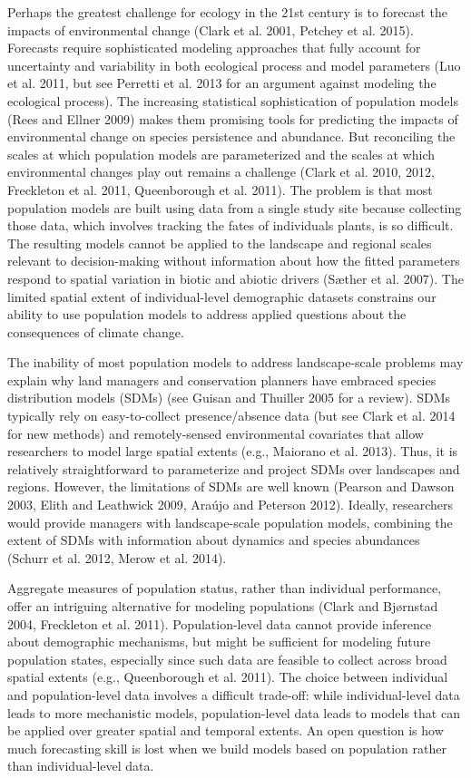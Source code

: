 \documentclass[12pt,]{article}
\begin{document}
Perhaps the greatest challenge for ecology in the 21st century is to
forecast the impacts of environmental change (Clark et al. 2001, Petchey
et al. 2015). Forecasts require sophisticated modeling approaches that
fully account for uncertainty and variability in both ecological process
and model parameters (Luo et al. 2011, but see Perretti et al. 2013 for
an argument against modeling the ecological process). The increasing
statistical sophistication of population models (Rees and Ellner 2009)
makes them promising tools for predicting the impacts of environmental
change on species persistence and abundance. But reconciling the scales
at which population models are parameterized and the scales at which
environmental changes play out remains a challenge (Clark et al. 2010,
2012, Freckleton et al. 2011, Queenborough et al. 2011). The problem is
that most population models are built using data from a single study
site because collecting those data, which involves tracking the fates of
individuals plants, is so difficult. The resulting models cannot be
applied to the landscape and regional scales relevant to decision-making
without information about how the fitted parameters respond to spatial
variation in biotic and abiotic drivers (Sæther et al. 2007). The
limited spatial extent of individual-level demographic datasets
constrains our ability to use population models to address applied
questions about the consequences of climate change.

The inability of most population models to address landscape-scale
problems may explain why land managers and conservation planners have
embraced species distribution models (SDMs) (see Guisan and Thuiller
2005 for a review). SDMs typically rely on easy-to-collect
presence/absence data (but see Clark et al. 2014 for new methods) and
remotely-sensed environmental covariates that allow researchers to model
large spatial extents (e.g., Maiorano et al. 2013). Thus, it is
relatively straightforward to parameterize and project SDMs over
landscapes and regions. However, the limitations of SDMs are well known
(Pearson and Dawson 2003, Elith and Leathwick 2009, Araújo and Peterson
2012). Ideally, researchers would provide managers with landscape-scale
population models, combining the extent of SDMs with information about
dynamics and species abundances (Schurr et al. 2012, Merow et al. 2014).

Aggregate measures of population status, rather than individual
performance, offer an intriguing alternative for modeling populations
(Clark and Bjørnstad 2004, Freckleton et al. 2011). Population-level
data cannot provide inference about demographic mechanisms, but might be
sufficient for modeling future population states, especially since such
data are feasible to collect across broad spatial extents (e.g.,
Queenborough et al. 2011). The choice between individual and
population-level data involves a difficult trade-off: while
individual-level data leads to more mechanistic models, population-level
data leads to models that can be applied over greater spatial and
temporal extents. An open question is how much forecasting skill is lost
when we build models based on population rather than individual-level
data.
\end{document}
